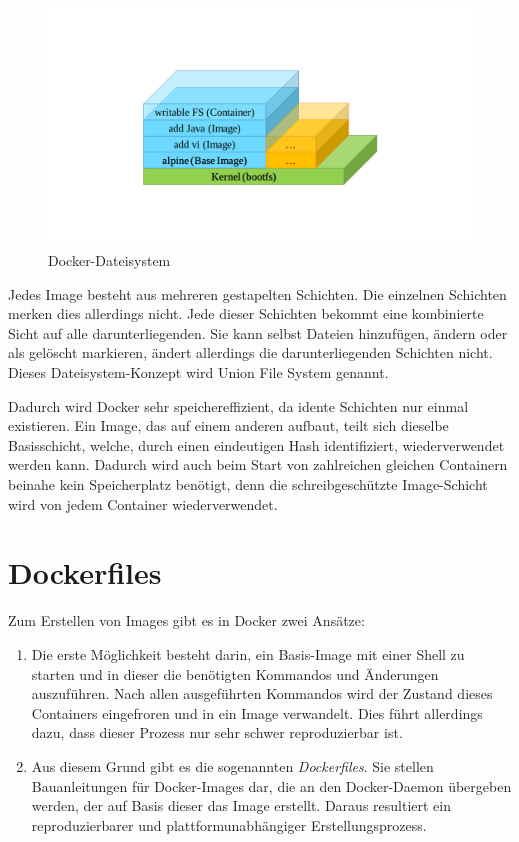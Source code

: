 \begin{figure}[htbp]
    \centering
    \includegraphics[width=0.7\linewidth,clip,trim=130 130 130 110]{images/docker-filesystem}
    \caption{Docker-Dateisystem}
\label{fig:docker-dateisystem}
\end{figure}

Jedes Image besteht aus mehreren gestapelten Schichten.
Die einzelnen Schichten merken dies allerdings nicht.
Jede dieser Schichten bekommt eine kombinierte Sicht auf alle darunterliegenden.
Sie kann selbst Dateien hinzufügen, ändern oder als gelöscht markieren, ändert allerdings die darunterliegenden Schichten nicht.
Dieses Dateisystem-Konzept wird Union File System genannt.

Dadurch wird Docker sehr speichereffizient, da idente Schichten nur einmal existieren.
Ein Image, das auf einem anderen aufbaut, teilt sich dieselbe Basisschicht, welche, durch einen eindeutigen Hash identifiziert, wiederverwendet werden kann.
Dadurch wird auch beim Start von zahlreichen gleichen Containern beinahe kein Speicherplatz benötigt, denn die schreibgeschützte Image-Schicht wird von jedem Container wiederverwendet.


\section{Dockerfiles}
\label{sec:dockerfiles}
Zum Erstellen von Images gibt es in Docker zwei Ansätze:
\begin{enumerate}
    \item Die erste Möglichkeit besteht darin, ein Basis-Image mit einer Shell zu starten und in dieser die benötigten Kommandos und Änderungen auszuführen.
    Nach allen ausgeführten Kommandos wird der Zustand dieses Containers eingefroren und in ein Image verwandelt.
    Dies führt allerdings dazu, dass dieser Prozess nur sehr schwer reproduzierbar ist.
    \item Aus diesem Grund gibt es die sogenannten \emph{Dockerfiles}.
    Sie stellen Bauanleitungen für Docker-Images dar, die an den Docker-Daemon übergeben werden, der auf Basis dieser das Image erstellt.
    Daraus resultiert ein reproduzierbarer und plattformunabhängiger Erstellungsprozess.
\end{enumerate}

